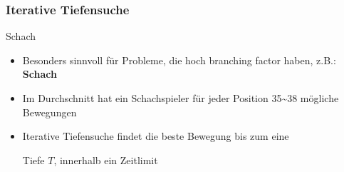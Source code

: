 \begin{frame}
	\frametitle{Iterative Tiefensuche}
	\begin{KITexampleblock}{Schach}
		\begin{itemize}
			\item Besonders sinnvoll für Probleme, die hoch branching factor haben, z.B.: \textbf{Schach}
			\item Im Durchschnitt hat ein Schachspieler für jeder Position 35\textasciitilde38 mögliche Bewegungen
			\item Iterative Tiefensuche findet die beste Bewegung bis zum eine 
			
			Tiefe $T$, innerhalb ein Zeitlimit
		\end{itemize}
	\end{KITexampleblock}
\end{frame}

